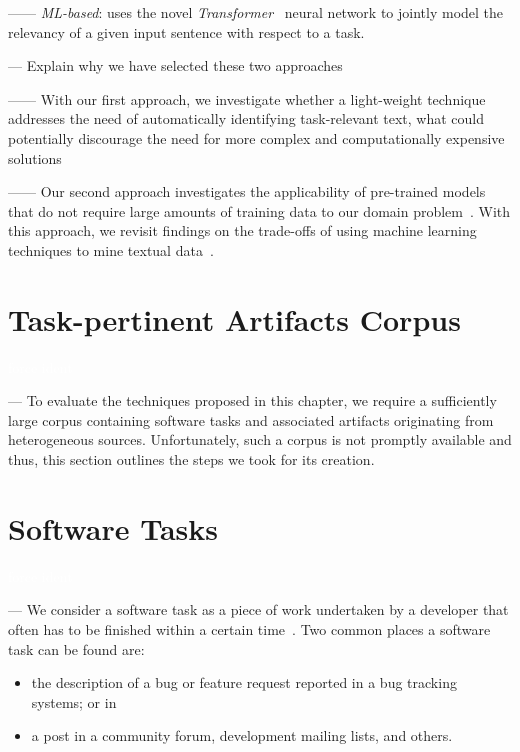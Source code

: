 ------ \textit{ML-based}: uses the novel \textit{Transformer}~\cite{Vaswani2017attention} neural network to jointly model the relevancy of a given input sentence with respect to a task. 

--- Explain why we have selected these two approaches

------ With our first approach, we investigate whether a light-weight technique addresses the need of automatically identifying task-relevant text, what could potentially discourage the need for more complex and computationally expensive solutions~\cite{Bavota2016}

------ Our second approach investigates the applicability of pre-trained models that do not require large amounts of training data to our domain problem~\cite{devlin2018bert, Ye2016}. With this approach, we revisit findings on the trade-offs of using machine learning techniques to mine textual data~\cite{Chaparro2017, Bavota2016}.



\clearpage

\section{Task-pertinent Artifacts Corpus}
\textcolor{white}{force ident} %

--- To evaluate the techniques proposed in this chapter, we require a sufficiently large corpus containing 
software tasks and associated artifacts originating from heterogeneous sources.
Unfortunately, such a corpus is not promptly available and thus, 
this section outlines the steps we took for its creation.


\section{Software Tasks}
\textcolor{white}{force ident} %

--- We consider a software task as a piece of work undertaken by a developer that often has to be finished within a certain time~\cite{2004merriam}. 
Two common places a software task can be found are:

\begin{itemize}
    \item the description of a bug or feature request reported in a bug tracking systems; or in
    \item a post in a community forum, development mailing lists, and others.
\end{itemize}

